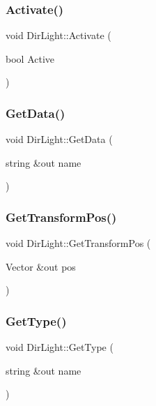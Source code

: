 \subsubsection{\texorpdfstring{Activate()}{Activate()}}
{\footnotesize\ttfamily void Dir\+Light\+::\+Activate (\begin{DoxyParamCaption}\item[{bool}]{Active }\end{DoxyParamCaption})}

\hypertarget{class_dir_light_a4b183acc902f8f2abfa511acaa6d2013}{}\label{class_dir_light_a4b183acc902f8f2abfa511acaa6d2013} 
\subsubsection{\texorpdfstring{Get\+Data()}{GetData()}}
{\footnotesize\ttfamily void Dir\+Light\+::\+Get\+Data (\begin{DoxyParamCaption}\item[{string \&out}]{name }\end{DoxyParamCaption})}

\hypertarget{class_dir_light_a1e334ab435f050aec344e03b076d3d81}{}\label{class_dir_light_a1e334ab435f050aec344e03b076d3d81} 
\subsubsection{\texorpdfstring{Get\+Transform\+Pos()}{GetTransformPos()}}
{\footnotesize\ttfamily void Dir\+Light\+::\+Get\+Transform\+Pos (\begin{DoxyParamCaption}\item[{Vector \&out}]{pos }\end{DoxyParamCaption})}

\hypertarget{class_dir_light_ae226fc1e83b9697fa5688842209d50b6}{}\label{class_dir_light_ae226fc1e83b9697fa5688842209d50b6} 
\subsubsection{\texorpdfstring{Get\+Type()}{GetType()}}
{\footnotesize\ttfamily void Dir\+Light\+::\+Get\+Type (\begin{DoxyParamCaption}\item[{string \&out}]{name }\end{DoxyParamCaption})}


